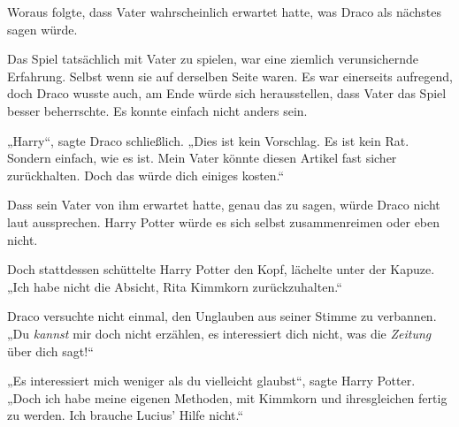 Woraus folgte, dass Vater wahrscheinlich erwartet hatte, was Draco als nächstes sagen würde.

Das Spiel tatsächlich mit Vater zu spielen, war eine ziemlich verunsichernde Erfahrung. Selbst wenn sie auf derselben Seite waren. Es war einerseits aufregend, doch Draco wusste auch, am Ende würde sich herausstellen, dass Vater das Spiel besser beherrschte. Es konnte einfach nicht anders sein.

„Harry“, sagte Draco schließlich.
„Dies ist kein Vorschlag. Es ist kein Rat. Sondern einfach, wie es ist. Mein Vater könnte diesen Artikel fast sicher zurückhalten. Doch das würde dich einiges kosten.“

Dass sein Vater von ihm erwartet hatte, genau das zu sagen, würde Draco nicht laut aussprechen. Harry Potter würde es sich selbst zusammenreimen oder eben nicht.

Doch stattdessen schüttelte Harry Potter den Kopf, lächelte unter der Kapuze.
„Ich habe nicht die Absicht, Rita Kimmkorn zurückzuhalten.“

Draco versuchte nicht einmal, den Unglauben aus seiner Stimme zu verbannen.
„Du \emph{kannst} mir doch nicht erzählen, es interessiert dich nicht, was die \emph{Zeitung} über dich sagt!“

„Es interessiert mich weniger als du vielleicht glaubst“, sagte Harry Potter.
„Doch ich habe meine eigenen Methoden, mit Kimmkorn und ihresgleichen fertig zu werden. Ich brauche Lucius’ Hilfe nicht.“

